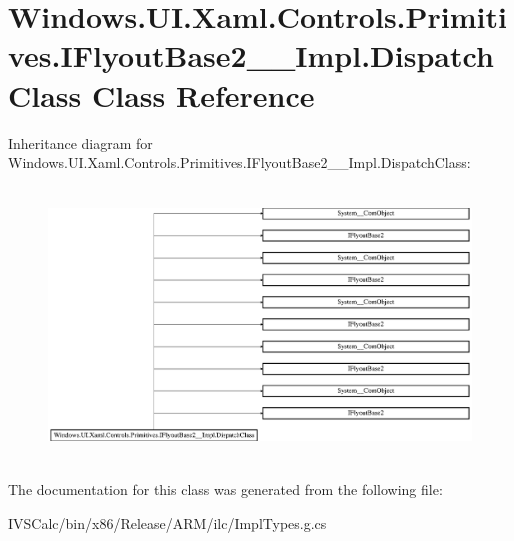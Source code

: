 \hypertarget{class_windows_1_1_u_i_1_1_xaml_1_1_controls_1_1_primitives_1_1_i_flyout_base2_____impl_1_1_dispatch_class}{}\section{Windows.\+U\+I.\+Xaml.\+Controls.\+Primitives.\+I\+Flyout\+Base2\+\_\+\+\_\+\+Impl.\+Dispatch\+Class Class Reference}
\label{class_windows_1_1_u_i_1_1_xaml_1_1_controls_1_1_primitives_1_1_i_flyout_base2_____impl_1_1_dispatch_class}
Inheritance diagram for Windows.\+U\+I.\+Xaml.\+Controls.\+Primitives.\+I\+Flyout\+Base2\+\_\+\+\_\+\+Impl.\+Dispatch\+Class\+:\begin{figure}[H]
\begin{center}
\leavevmode
\includegraphics[height=7.281324cm]{class_windows_1_1_u_i_1_1_xaml_1_1_controls_1_1_primitives_1_1_i_flyout_base2_____impl_1_1_dispatch_class}
\end{center}
\end{figure}


The documentation for this class was generated from the following file\+:\begin{DoxyCompactItemize}
\item 
I\+V\+S\+Calc/bin/x86/\+Release/\+A\+R\+M/ilc/Impl\+Types.\+g.\+cs\end{DoxyCompactItemize}
